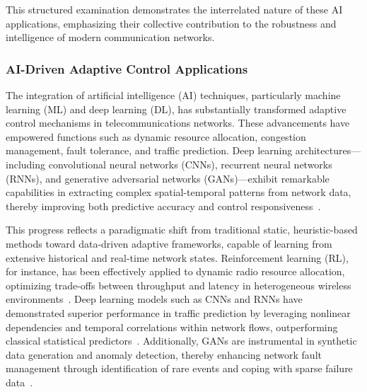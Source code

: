 \documentclass[sigconf]{acmart}
\begin{document}
This structured examination demonstrates the interrelated nature of these AI applications, emphasizing their collective contribution to the robustness and intelligence of modern communication networks.

\subsubsection{AI-Driven Adaptive Control Applications}

The integration of artificial intelligence (AI) techniques, particularly machine learning (ML) and deep learning (DL), has substantially transformed adaptive control mechanisms in telecommunications networks. These advancements have empowered functions such as dynamic resource allocation, congestion management, fault tolerance, and traffic prediction. Deep learning architectures—including convolutional neural networks (CNNs), recurrent neural networks (RNNs), and generative adversarial networks (GANs)—exhibit remarkable capabilities in extracting complex spatial-temporal patterns from network data, thereby improving both predictive accuracy and control responsiveness~\cite{ref1,ref2,ref3,ref5,ref6,ref10,ref11,ref14,ref50}.

This progress reflects a paradigmatic shift from traditional static, heuristic-based methods toward data-driven adaptive frameworks, capable of learning from extensive historical and real-time network states. Reinforcement learning (RL), for instance, has been effectively applied to dynamic radio resource allocation, optimizing trade-offs between throughput and latency in heterogeneous wireless environments~\cite{ref1,ref7}. Deep learning models such as CNNs and RNNs have demonstrated superior performance in traffic prediction by leveraging nonlinear dependencies and temporal correlations within network flows, outperforming classical statistical predictors~\cite{ref2,ref3,ref5}. Additionally, GANs are instrumental in synthetic data generation and anomaly detection, thereby enhancing network fault management through identification of rare events and coping with sparse failure data~\cite{ref6,ref10}.
\end{document}
